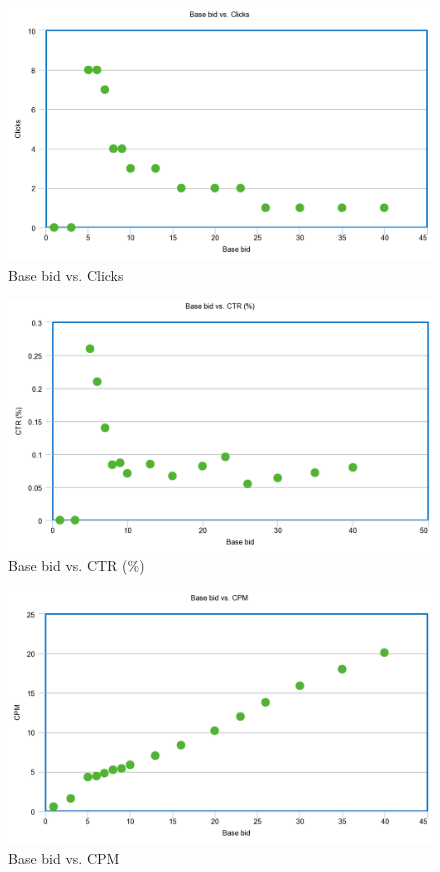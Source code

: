 \documentclass{sig-alternate-05-2015}
\begin{document}
\begin{figure}
  \includegraphics[width=\linewidth]{linear_clicks.png}
  \caption{Base bid vs. Clicks}
  \label{fig:bids}
\end{figure}

\begin{figure}
  \includegraphics[width=\linewidth]{linear_CTR.png}
  \caption{Base bid vs. CTR (\%)}
  \label{fig:bids}
\end{figure}

\begin{figure}
  \includegraphics[width=\linewidth]{linear_CPM.png}
  \caption{Base bid vs. CPM}
  \label{fig:bids}
\end{figure}
\end{document}
